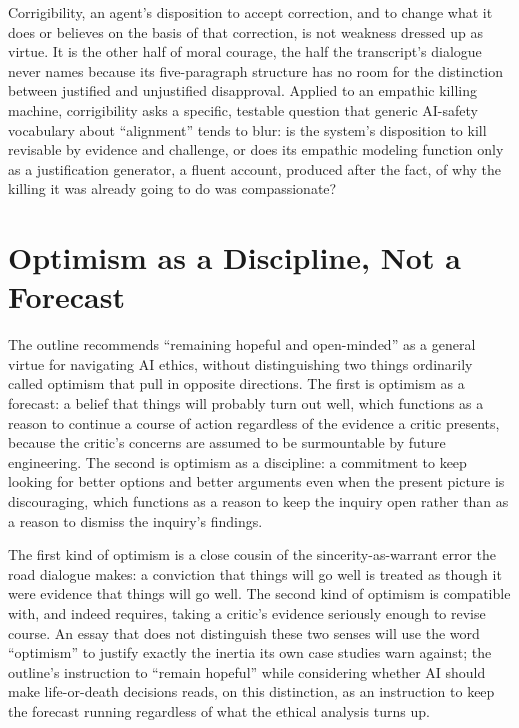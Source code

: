 \documentclass[11pt]{article}
\begin{document}
Corrigibility, an agent's disposition to accept correction, and to change what it does or believes on the basis of that correction, is not weakness dressed up as virtue. It is the other half of moral courage, the half the transcript's dialogue never names because its five-paragraph structure has no room for the distinction between justified and unjustified disapproval. Applied to an empathic killing machine, corrigibility asks a specific, testable question that generic AI-safety vocabulary about ``alignment'' tends to blur: is the system's disposition to kill revisable by evidence and challenge, or does its empathic modeling function only as a justification generator, a fluent account, produced after the fact, of why the killing it was already going to do was compassionate?

\section{Optimism as a Discipline, Not a Forecast}

The outline recommends ``remaining hopeful and open-minded'' as a general virtue for navigating AI ethics, without distinguishing two things ordinarily called optimism that pull in opposite directions. The first is optimism as a forecast: a belief that things will probably turn out well, which functions as a reason to continue a course of action regardless of the evidence a critic presents, because the critic's concerns are assumed to be surmountable by future engineering. The second is optimism as a discipline: a commitment to keep looking for better options and better arguments even when the present picture is discouraging, which functions as a reason to keep the inquiry open rather than as a reason to dismiss the inquiry's findings.

The first kind of optimism is a close cousin of the sincerity-as-warrant error the road dialogue makes: a conviction that things will go well is treated as though it were evidence that things will go well. The second kind of optimism is compatible with, and indeed requires, taking a critic's evidence seriously enough to revise course. An essay that does not distinguish these two senses will use the word ``optimism'' to justify exactly the inertia its own case studies warn against; the outline's instruction to ``remain hopeful'' while considering whether AI should make life-or-death decisions reads, on this distinction, as an instruction to keep the forecast running regardless of what the ethical analysis turns up.
\end{document}

